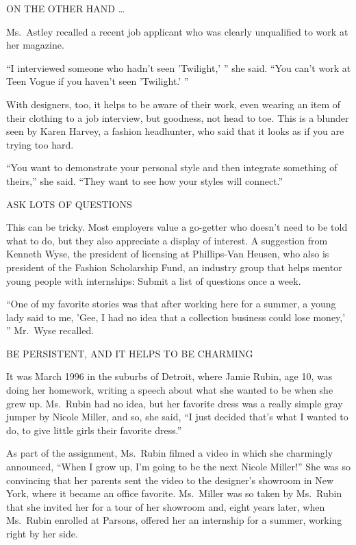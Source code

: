﻿\documentclass[12pt]{article}
\begin{document}
ON THE OTHER HAND \ldots

Ms.~Astley recalled a recent job applicant who was clearly unqualified to work at her magazine.

``I interviewed someone who hadn't seen 'Twilight,' '' she said. ``You can't work at Teen Vogue if
you haven't seen 'Twilight.' ''

With designers, too, it helps to be aware of their work, even wearing an item of their clothing to a
job interview, but goodness, not head to toe. This is a blunder seen by Karen Harvey, a fashion
headhunter, who said that it looks as if you are trying too hard.

``You want to demonstrate your personal style and then integrate something of theirs,'' she said.
``They want to see how your styles will connect.''

ASK LOTS OF QUESTIONS

This can be tricky. Most employers value a go-getter who doesn't need to be told what to do, but
they also appreciate a display of interest. A suggestion from Kenneth Wyse, the president of
licensing at Phillips-Van Heusen, who also is president of the Fashion Scholarship Fund, an industry
group that helps mentor young people with internships: Submit a list of questions once a week.

``One of my favorite stories was that after working here for a summer, a young lady said to me,
'Gee, I had no idea that a collection business could lose money,' '' Mr.~Wyse recalled.

BE PERSISTENT, AND IT HELPS TO BE CHARMING

It was March 1996 in the suburbs of Detroit, where Jamie Rubin, age 10, was doing her homework,
writing a speech about what she wanted to be when she grew up. Ms.~Rubin had no idea, but her
favorite dress was a really simple gray jumper by Nicole Miller, and so, she said, ``I just decided
that's what I wanted to do, to give little girls their favorite dress.''

As part of the assignment, Ms.~Rubin filmed a video in which she charmingly announced, ``When I grow
up, I'm going to be the next Nicole Miller!'' She was so convincing that her parents sent the video
to the designer's showroom in New York, where it became an office favorite. Ms.~Miller was so taken
by Ms.~Rubin that she invited her for a tour of her showroom and, eight years later, when Ms.~Rubin
enrolled at Parsons, offered her an internship for a summer, working right by her side.
\end{document}
